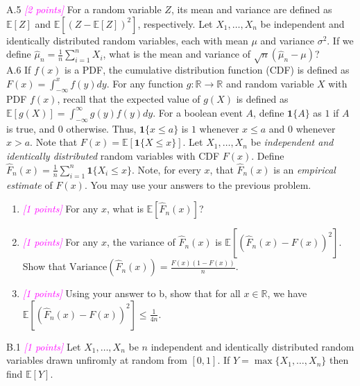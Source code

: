 \documentclass{article}
\newcommand{\field}[1]{\mathbb{#1}}
\newcommand{\1}{\mathbf{1}}
\newcommand{\E}{\mathbb{E}}
\newcommand{\R}{\field{R}} %
\newcommand{\points}[1]{\small\textcolor{magenta}{\emph{[#1 points]}} \normalsize}
\begin{document}
A.5 \points{2} For a random variable $Z$, its mean and variance are defined as $\E[Z]$ and $\E[(Z-\E[Z])^2]$, respectively.
Let $X_1,\dots,X_n$ be independent and identically distributed random variables, each with mean $\mu$ and variance $\sigma^2$. 
If we define $\widehat{\mu}_n = \frac{1}{n} \sum_{i=1}^n X_i$, what is the mean and variance of $\sqrt{n}(\widehat{\mu}_n - \mu)$?\\

A.6 If $f(x)$ is a PDF, the cumulative distribution function (CDF)
  is  defined as $F(x) = \int_{-\infty}^x f(y) dy$.  For any function
  $g : \R \rightarrow \R$ and random variable $X$ with PDF $f(x)$,
  recall that the expected value of $g(X)$ is defined as
  $\E[g(X)] = \int_{-\infty}^\infty g(y) f(y) dy$. For a boolean event
  $A$, define $\1\{ A \}$ as $1$ if $A$ is true, and $0$
  otherwise. Thus, $\1\{ x \leq a \}$ is $1$ whenever $x \leq a$ and
  $0$ whenever $x > a$.  Note that $F(x) = \E[\1\{X \leq x\}]$.  Let
  $X_1,\dots,X_n$ be \emph{independent and identically distributed}
  random variables with CDF $F(x)$.  Define
  $\widehat{F}_n(x) = \frac{1}{n} \sum_{i=1}^n \1\{X_i \leq
  x\}$. Note, for every $x$,
  that $\widehat{F}_n(x)$ is an \emph{empirical estimate} of  $F(x)$.
  You may use your answers to the previous problem.
  \begin{enumerate}
  \item \points{1} For any $x$, what is $\E[ \widehat{F}_n(x) ]$?
  \item \points{1} For any $x$, the variance of $\widehat{F}_n(x)$ is $\E[ ( \widehat{F}_n(x) -
    F(x) )^2 ]$.  Show that $\textrm{Variance}(\widehat{F}_n(x)) = \frac{F(x)(1-F(x))}{n}$. \\
  \item \points{1} Using your answer to b, show that
    for all $x\in \R$, we have  $\displaystyle \E[ ( \widehat{F}_n(x) - F(x) )^2 ] \leq \tfrac{1}{4n}$.  
  \end{enumerate} 

B.1  \points{1} Let $X_1,\dots,X_n$ be $n$ independent and identically distributed random variables drawn unfiromly at random from $[0,1]$. If $Y = \max\{X_1,\dots,X_n\}$ then find $\E[Y]$.\\
\end{document}
